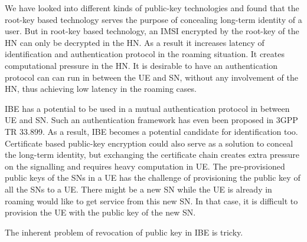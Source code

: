 \documentclass[runningheads,a4paper]{llncs} %
\begin{document}
We have looked into different kinds of public-key technologies and found that the root-key based technology serves the purpose of concealing long-term identity of a user. But in root-key based technology, an IMSI encrypted by the root-key of the HN can only be decrypted in the HN. As a result it increases latency of identification and authentication protocol in the roaming situation. It creates computational pressure in the HN. It is desirable to have an authentication protocol can can run in between the UE and SN, without any involvement of the HN, thus achieving low latency in the roaming cases.

IBE has a potential to be used in a mutual authentication protocol in between UE and SN. Such an authentication framework has even been proposed in 3GPP TR 33.899. As a result, IBE becomes a potential candidate for identification too. Certificate based public-key encryption could also serve as a solution to conceal the long-term identity, but exchanging the certificate chain creates extra pressure on the signalling and requires heavy computation in UE. The pre-provisioned public keys of the SNs in a UE has the challenge of provisioning the public key of all the SNs to a UE. There might be a new SN while the UE is already in roaming would like to get service from this new SN. In that case, it is difficult to provision the UE with the public key of the new SN. 

The inherent problem of revocation of public key in IBE is tricky. 
\end{document}
